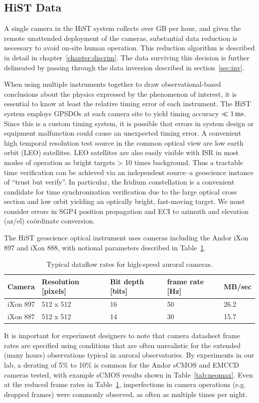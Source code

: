 \FloatBarrier
\subsection{HiST Data}
A single camera in the HiST system collects over \unit[100]{GB} per hour, and given the remote unattended deployment of the cameras, substantial data reduction is necessary to avoid on-site human operation.
This reduction algorithm is described in detail in chapter~\ref{chapter:discrim}.
The data surviving this decision is further delineated by passing through the data inversion described in section~\ref{sec:inv}.

When using multiple instruments together to draw observational-based conclusions about the physics expressed by the phenomenon of interest, it is essential to know at least the relative timing error of each instrument. 
The HiST system employs GPSDOs at each camera site to yield timing accuracy $\ll \unit[1]{ms}$. 
Since this is a custom timing system, it is possible that errors in system design or equipment malfunction could cause an unexpected timing error. 
A convenient high temporal resolution test source in the common optical view are low earth orbit (LEO) satellites. 
LEO satellites are also easily visible with ISR in most modes of operation as bright targets > 10 times background.
Thus a tractable time verification can be achieved via an independent source--a geoscience instance of ``trust but verify''.
In particular, the Iridium constellation is a convenient candidate for time synchronization verification due to the large optical cross section and low orbit yielding an optically bright, fast-moving target. 
We must consider errors in SGP4 position propagation and ECI to azimuth and elevation (az/el) coördinate conversion.

The HiST geoscience optical instrument uses cameras including the Andor iXon 897 and iXon 888, with notional parameters described in Table~\ref{tab:ixonrate}. 
\begin{table}\centering
    \caption{Typical dataflow rates for high-speed auroral cameras.}\label{tab:ixonrate}
    \begin{tabular}{lllll}
        \toprule
        Camera & Resolution [pixels] & Bit depth [bits] & frame rate [Hz] & MB/sec \\
        \midrule
        iXon 897 & 512 x 512 & 16 & 50 & 26.2 \\
        iXon 887 & 512 x 512 & 14 & 30 & 15.7 \\
        \bottomrule
    \end{tabular}
\end{table}
It is important for experiment designers to note that camera datasheet frame rates are specified using conditions that are often unrealistic for the extended (many hours) observations typical in auroral observatories. 
By experiments in our lab, a derating of 5\% to 10\% is common for the Andor sCMOS and EMCCD cameras tested, with example sCMOS results shown in Table~\ref{tab:neomax}.
Even at the reduced frame rates in Table~\ref{tab:ixonrate}, imperfections in camera operations (e.g. dropped frames) were commonly observed, as often as multiple times per night.


